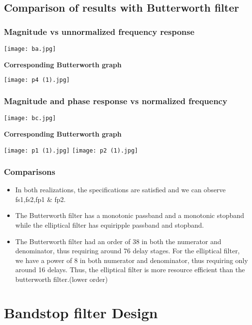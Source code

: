 \documentclass[12pt]{article}
\begin{document}
\subsection{Comparison of results with Butterworth filter}
\subsubsection{Magnitude vs unnormalized frequency response }
\begin{center}
\texttt{[image: ba.jpg]}
\end{center}
\newpage
\textbf{Corresponding Butterworth graph}
\begin{center}
\texttt{[image: p4 (1).jpg]}
\end{center}
\subsubsection{Magnitude and phase response vs normalized frequency}
\begin{center}
\texttt{[image: bc.jpg]}
\end{center}
\textbf{Corresponding Butterworth graph}
\begin{center}
\texttt{[image: p1 (1).jpg]}
\texttt{[image: p2 (1).jpg]}
\end{center}
\subsubsection{Comparisons}
\begin{itemize}
    \item In both realizations, the specifications are satisfied and we can observe fs1,fs2,fp1 \& fp2.
    \item The Butterworth filter has a monotonic passband and a monotonic stopband while the elliptical filter has equiripple passband and stopband.
    \item The Butterworth filter had an order of 38 in both the numerator and denominator, thus requiring around 76 delay stages. For the elliptical filter, we have a power of 8 in both numerator and denominator, thus requiring only around 16 delays. Thus, the elliptical filter is more resource efficient than the butterworth filter.(lower order)
\end{itemize}

\section{Bandstop filter Design}
\end{document}
